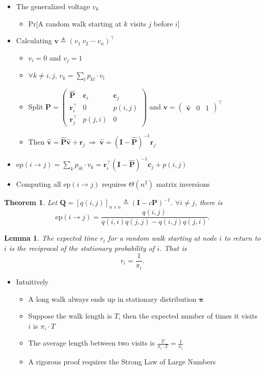 \documentclass{article}
\newtheorem*{mythm*}{Theorem}
\newtheorem*{mylem*}{Lemma}
\begin{document}
\begin{itemize}
\item The generalized voltage $v_k$
\begin{itemize}
\item Pr[A random walk starting at $k$ visits $j$ before $i$]
\end{itemize}
\item Calculating $\bm{v} \triangleq (v_1\ v_2\ \cdots\ v_n)^\top$
\begin{itemize}
\item $v_i = 0$ and $v_j = 1$
\item $\forall k\neq i, j$, $v_k = \sum\limits_l p_{kl} \cdot v_l$
\item Split
$\bm{P} = \begin{pmatrix}
\hat{\bm{P}} & \bm{c}_i & \bm{c}_j \\
\bm{r}_i^\top & 0 & p(i,j) \\
\bm{r}_j^\top & p(j,i) & 0
\end{pmatrix}$
and $\bm{v} = \begin{pmatrix} \hat{\bm{v}} & 0 & 1 \end{pmatrix}^\top$
\item Then $\hat{\bm{v}} = \hat{\bm{P}} \hat{\bm{v}} + \bm{r}_j \ \Rightarrow\ \hat{\bm{v}} = (\bm{I} - \hat{\bm{P}})^{-1} \bm{r}_j$
\end{itemize}
\item $\mathrm{ep}(i\rightarrow j) = \sum\limits_k p_{ik} \cdot v_k = \bm{r}_i^\top (\bm{I} - \hat{\bm{P}})^{-1} \bm{c}_j + p(i,j)$
\item Computing all $\mathrm{ep}(i\rightarrow j)$ requires $\Theta(n^2)$ matrix inversions
\end{itemize}

\begin{mythm*}
Let $\bm{Q} = \left[ q(i,j) \right]_{n\times n} \triangleq (\bm{I} - c\bm{P})^{-1}$. $\forall i\neq j$, there is
\[
\mathrm{ep}(i\rightarrow j) = \frac{q(i,j)}{q(i,i)q(j,j) - q(i,j)q(j,i)}.
\]
\end{mythm*}

\begin{mylem*}
The expected time $r_i$ for a random walk starting at node $i$ to return to $i$ is the reciprocal of the stationary probability of $i$.
That is
\[
r_i = \frac{1}{\pi_i}.
\]
\end{mylem*}

\begin{itemize}
\item Intuitively
\begin{itemize}
\item A long walk always ends up in stationary distribution $\bm{\pi}$
\item Suppose the walk length is $T$, then the expected number of times it visits $i$ is $\pi_i \cdot T$
\item The average length between two visits is $\frac{T}{\pi_i \cdot T} = \frac{1}{\pi_i}$
\item A rigorous proof requires the Strong Law of Large Numbers
\end{itemize}
\end{itemize}
\end{document}
